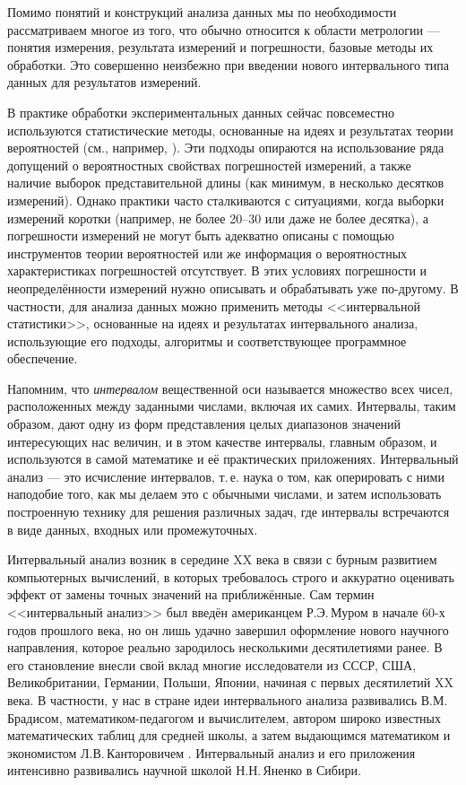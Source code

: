 \documentclass[a5paper,openany]{book}
\begin{document}
Помимо понятий и конструкций анализа данных  мы по необходимости рассматриваем 
многое из того, что обычно относится к области метрологии --- понятия измерения, 
результата измерений и погрешности, базовые методы их обработки. Это совершенно 
неизбежно при введении нового интервального типа данных для результатов измерений. 
  
В практике обработки экспериментальных данных сейчас повсеместно используются 
статистические методы, основанные на идеях и результатах теории вероятностей (см., 
например, \cite{GUM, JCGM102RU, GOSTDirect, R50MNK, GOSTIndirect}). Эти подходы 
опираются на использование ряда допущений о вероятностных свойствах погрешностей 
измерений, а также наличие выборок представительной длины (как минимум, в несколько 
десятков измерений). Однако практики часто сталкиваются с ситуациями, когда выборки 
измерений коротки (например, не более 20--30 или даже не более десятка), а погрешности 
измерений не могут быть адекватно описаны с помощью инструментов теории вероятностей 
или же информация о вероятностных характеристиках погрешностей отсутствует. В этих 
условиях погрешности и неопределённости измерений нужно описывать и обрабатывать уже 
по-другому. В частности, для анализа данных можно применить методы <<интервальной 
статистики>>, основанные на идеях и результатах интервального анализа, использующие 
его подходы, алгоритмы и соответствующее программное обеспечение. 
  
Напомним, что \emph{интервалом} вещественной оси называется множество всех чисел, 
расположенных между заданными числами, включая их самих. Интервалы, таким образом, 
дают одну из форм представления целых диапазонов значений интересующих нас величин, 
и в этом качестве интервалы, главным образом, и используются в самой математике и  
её практических приложениях. Интервальный анализ --- это исчисление интервалов, т.\,е. 
наука о том, как оперировать с ними наподобие того, как мы делаем это с обычными 
числами, и затем использовать построенную технику для решения различных задач, где 
интервалы встречаются в виде данных, входных или промежуточных.   
  
Интервальный анализ возник в середине XX века в связи с бурным развитием компьютерных 
вычислений, в которых требовалось строго и аккуратно оценивать эффект от замены точных 
значений на приближённые. Сам термин <<интервальный анализ>> был введён американцем 
Р.Э.\,Муром в начале 60-х годов прошлого века, но он лишь удачно завершил оформление 
нового научного направления, которое реально зародилось несколькими десятилетиями 
ранее. В его становление внесли свой вклад многие исследователи из СССР, США, 
Великобритании, Германии, Польши, Японии, начиная с первых десятилетий XX века. 
В частности, у нас в стране идеи интервального анализа развивались В.М.\,Брадисом, 
математиком-педагогом и вычислителем, автором широко известных математических таблиц 
для средней школы, а затем выдающимся математиком и экономистом Л.В.\,Канторовичем 
\cite{Kantorovich}. Интервальный анализ и его приложения интенсивно развивались 
научной школой Н.Н.\,Яненко в Сибири. 
  
\end{document}
